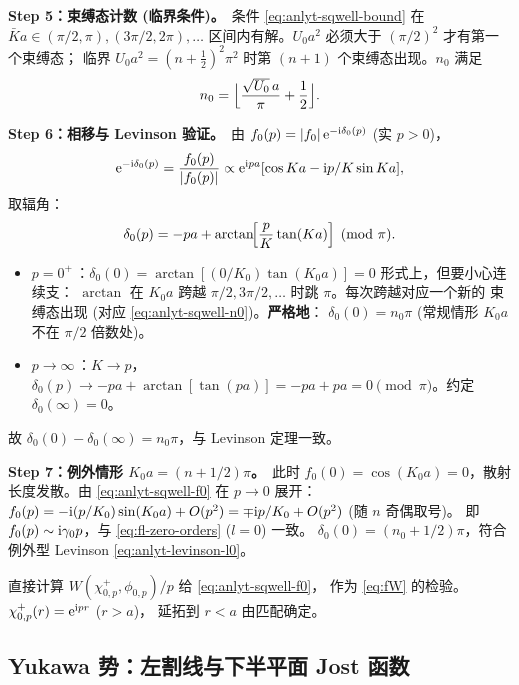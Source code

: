 \textbf{Step 5：束缚态计数 (临界条件)。}\,
条件 \eqref{eq:anlyt-sqwell-bound} 在 $\bar K a\in(\pi/2,\pi),(3\pi/2,2\pi),\ldots$
区间内有解。$U_0a^2$ 必须大于 $(\pi/2)^2$ 才有第一个束缚态；
临界 $U_0 a^2=(n+\tfrac{1}{2})^2\pi^2$ 时第 $(n+1)$ 个束缚态出现。$n_0$ 满足
\begin{equation}
n_0=\Bigl\lfloor\frac{\sqrt{U_0}\,a}{\pi}+\frac{1}{2}\Bigr\rfloor.
\label{eq:anlyt-sqwell-n0}
\end{equation}

\textbf{Step 6：相移与 Levinson 验证。}\,
由 $f_0(p)=|f_0|\,\mathrm{e}^{-\mathrm{i}\delta_0(p)}$ (实 $p>0$)，
\begin{equation}
\mathrm{e}^{-\mathrm{i}\delta_0(p)}=\frac{f_0(p)}{|f_0(p)|}\propto\mathrm{e}^{\mathrm{i} pa}[\cos Ka-\mathrm{i} p/K\sin Ka],
\end{equation}
取辐角：
\begin{equation}
\delta_0(p)=-pa+\arctan\!\Bigl[\frac{p}{K}\tan(Ka)\Bigr]\pmod\pi.
\label{eq:anlyt-sqwell-delta}
\end{equation}
\begin{itemize}
\item $p=0^+$\,：$\delta_0(0)=\arctan[(0/K_0)\tan(K_0 a)]=0$ 形式上，但要小心连续支：
$\arctan$ 在 $K_0 a$ 跨越 $\pi/2,3\pi/2,\ldots$ 时跳 $\pi$。每次跨越对应一个新的
束缚态出现 (对应 \eqref{eq:anlyt-sqwell-n0})。\textbf{严格地}：
$\delta_0(0)=n_0\pi$ (常规情形 $K_0 a$ 不在 $\pi/2$ 倍数处)。
\item $p\to\infty$\,：$K\to p$，
$\delta_0(p)\to -pa+\arctan[\tan(pa)]=-pa+pa=0\pmod\pi$。约定
$\delta_0(\infty)=0$。
\end{itemize}
故 $\delta_0(0)-\delta_0(\infty)=n_0\pi$，与 Levinson 定理一致。\checkmark

\textbf{Step 7：例外情形 $K_0 a=(n+1/2)\pi$。}\,
此时 $f_0(0)=\cos(K_0 a)=0$，散射长度发散。由
\eqref{eq:anlyt-sqwell-f0} 在 $p\to 0$ 展开：
$f_0(p)=-\mathrm{i}(p/K_0)\sin(K_0 a)+O(p^2)=\mp\mathrm{i} p/K_0+O(p^2)$ (随 $n$ 奇偶取号)。
即 $f_0(p)\sim\mathrm{i}\gamma_0 p$，与 \eqref{eq:fl-zero-orders} ($l=0$) 一致。
$\delta_0(0)=(n_0+1/2)\pi$，符合例外型 Levinson \eqref{eq:anlyt-levinson-l0}。

\begin{remark}[显式 Wronskian 验证]
直接计算 $W(\chi^+_{0,p},\phi_{0,p})/p$ 给 \eqref{eq:anlyt-sqwell-f0}，
作为 \eqref{eq:fW} 的检验。$\chi^+_{0,p}(r)=\mathrm{e}^{\mathrm{i} pr}$ ($r>a$)，
延拓到 $r<a$ 由匹配确定。
\end{remark}

\subsection{Yukawa 势：左割线与下半平面 Jost 函数}\label{ssec:anlyt-ex-yukawa}

